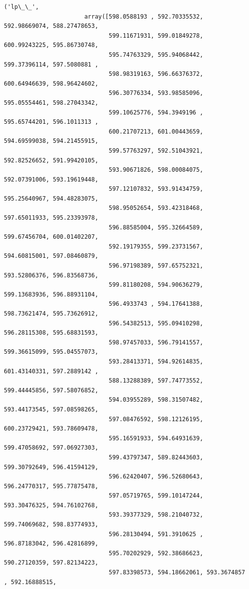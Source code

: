 \documentclass[11pt]{article}
\begin{document}
\begin{Verbatim}[commandchars=\\\{\}]
                      ('lp\_\_',
                       array([598.0588193 , 592.70335532, 592.98669074, 588.27478653,
                              599.11671931, 599.01849278, 600.99243225, 595.86730748,
                              595.74763329, 595.94068442, 599.37396114, 597.5080881 ,
                              598.98319163, 596.66376372, 600.64946639, 598.96424602,
                              596.30776334, 593.98585096, 595.05554461, 598.27043342,
                              599.10625776, 594.3949196 , 595.65744201, 596.1011313 ,
                              600.21707213, 601.00443659, 594.69599038, 594.21455915,
                              599.57763297, 592.51043921, 592.82526652, 591.99420105,
                              593.90671826, 598.00084075, 592.07391006, 593.19619448,
                              597.12107832, 593.91434759, 595.25640967, 594.48283075,
                              598.95052654, 593.42318468, 597.65011933, 595.23393978,
                              596.88585004, 595.32664589, 599.67456704, 600.01402207,
                              592.19179355, 599.23731567, 594.60815001, 597.08460879,
                              596.97198389, 597.65752321, 593.52806376, 596.83568736,
                              599.81180208, 594.90636279, 599.13683936, 596.88931104,
                              596.4933743 , 594.17641388, 598.73621474, 595.73626912,
                              596.54382513, 595.09410298, 596.28115308, 595.68831593,
                              598.97457033, 596.79141557, 599.36615099, 595.04557073,
                              593.28413371, 594.92614835, 601.43140331, 597.2889142 ,
                              588.13288389, 597.74773552, 599.44445856, 597.58076852,
                              594.03955289, 598.31507482, 593.44173545, 597.08598265,
                              597.08476592, 598.12126195, 600.23729421, 593.78609478,
                              595.16591933, 594.64931639, 599.47058692, 597.06927303,
                              599.43797347, 589.82443603, 599.30792649, 596.41594129,
                              596.62420407, 596.52680643, 596.24770317, 595.77875478,
                              597.05719765, 599.10147244, 593.30476325, 594.76102768,
                              593.39377329, 598.21040732, 599.74069682, 598.83774933,
                              596.28130494, 591.3910625 , 596.87183042, 596.42816899,
                              595.70202929, 592.38686623, 590.27120359, 597.82134223,
                              597.83398573, 594.18662061, 593.3674857 , 592.16888515,

\end{Verbatim}
\end{document}

